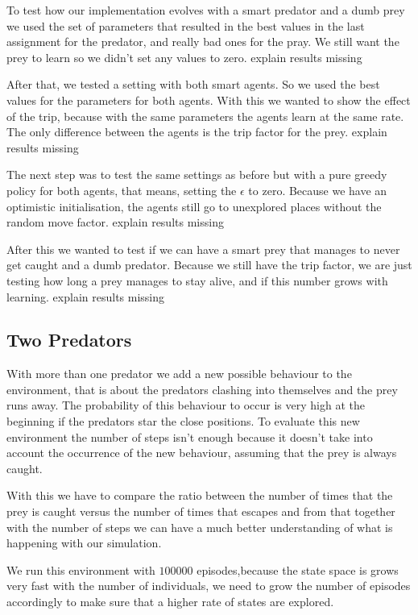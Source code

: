 \documentclass{article}
\begin{document}
To test how our implementation evolves with a smart predator and a dumb prey we
used the set of parameters that resulted in the best values in the last
assignment for the predator, and really bad ones for the pray. We still want the
prey to learn so we didn't set any values to zero.
\error explain results missing



After that, we tested a setting with both smart agents. So we used the best
values for the parameters for both agents. With this we wanted to show the effect
of the trip, because with the same parameters the agents learn at the same rate.
The only difference between the agents is the trip factor for the prey.
\error explain results missing

The next step was to test the same settings as before but with a pure greedy
policy for both agents, that means, setting the $\epsilon$ to zero. Because we
have an optimistic initialisation, the agents still go to unexplored places
without the random move factor.
\error explain results missing

After this we wanted to test if we can have a smart prey that manages to never
get caught and a dumb predator. Because we still have the trip
factor, we are just testing how long a prey manages to stay alive, and if this
number grows with learning.
\error explain results missing


\subsection{Two Predators}
\label{twoP}
With more than one predator we add a new possible behaviour to the environment,
that is about the predators clashing into themselves and the prey runs away. The
probability of this behaviour to occur is very high at the beginning if the
predators star the close positions. To evaluate this new environment the number
of steps isn't enough because it doesn't take into account the occurrence of the
new behaviour, assuming that the prey is always caught. 

With this we have to compare the ratio between the number of times that the prey
is caught versus the number of times that escapes and from that together
with the number of steps we can have a much better understanding of what is
happening with our simulation.

We run this environment with $100000$ episodes,because the state space is grows
very fast with the number of individuals, we need to grow the number of episodes
accordingly to make sure that a higher rate of states are explored.
\end{document}
